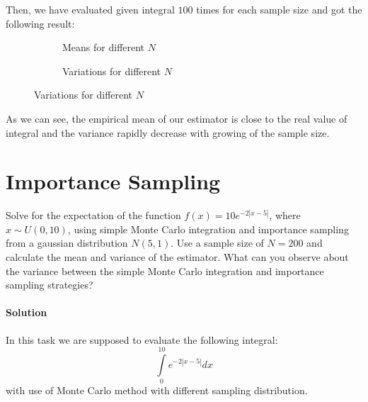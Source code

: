 \documentclass[a4paper, 12pt]{article}
\newcommand{\sol}{
    \paragraph{Solution}
}
\begin{document}
Then, we have evaluated given integral $100$ times for each
sample size and got the following result:
\begin{figure}[!ht]
    \begin{subfigure}{.49\textwidth}
        \caption{Means for different $N$}
    \end{subfigure}
    \begin{subfigure}{.49\textwidth}
        \caption{Variations for different $N$}
    \end{subfigure}
\end{figure}

As we can see, the empirical mean of our estimator is close to
the real value of integral and the variance rapidly decrease with
growing of the sample size.


\section{Importance Sampling}
Solve for the expectation of the function $f(x) = 10e^{-2|x-5|}$, where $x \sim U (0, 10)$,
using simple Monte Carlo integration and importance sampling
from a gaussian distribution $N(5, 1)$. Use a sample size of
$N = 200$ and calculate the mean and variance of the estimator.
What can you observe about the variance between the simple
Monte Carlo integration and importance sampling strategies?

\sol In this task we are supposed to evaluate the following
integral:
\[
    \int\limits_0^{10} e^{-2|x-5|} dx
\]
with use of Monte Carlo method with different
sampling distribution.
\pagebreak
\end{document}
